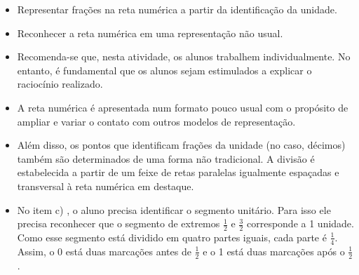\begin{atividade}\label{chap3-ativ10}
\objetivos
\begin{itemize} %
    \item       Representar frações na reta numérica a partir da identificação da unidade.
    \item       Reconhecer a reta numérica em uma representação não usual.
\end{itemize} %

\discussoes
\begin{itemize} %
    \item       Recomenda-se que, nesta atividade, os alunos trabalhem individualmente. No entanto, é fundamental que os alunos sejam estimulados a explicar o raciocínio realizado.
    \item       A reta numérica é apresentada num formato pouco usual com o propósito de ampliar e variar o contato com outros modelos de representação.
    \item       Além disso, os pontos que identificam frações da unidade (no caso, décimos) também são determinados de uma forma não tradicional. A divisão é estabelecida a partir de um feixe de retas paralelas igualmente espaçadas e transversal à reta numérica em destaque.
    \item       No item c) , o aluno precisa identificar o segmento unitário. Para isso ele precisa reconhecer que o segmento de extremos $\frac{1}{2}$ e $\frac{3}{2}$ corresponde a 1 unidade. Como esse segmento está dividido em quatro partes iguais, cada parte é $\frac{1}{4}$. Assim, o 0 está duas marcações antes de $\frac{1}{2}$ e o 1 está duas marcações após o $\frac{1}{2}$.
\end{itemize} %

\solucao

\begin{enumerate}
\begin{multicols}{2}
\item {}
{
\resizebox{.875\linewidth}{!}
{
}}
\end{multicols}
\end{enumerate}
\end{atividade}
